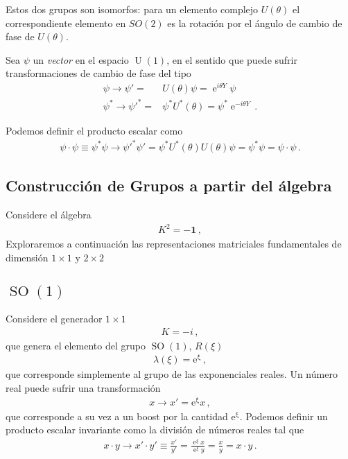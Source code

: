 Estos dos grupos son isomorfos: para un elemento complejo $U(\theta)$ el correspondiente elemento en $SO(2)$ es la rotación por el ángulo de cambio de fase de $U(\theta)$.

\begin{frame}
Sea $\psi$ un \emph{vector} en el espacio $\operatorname{U}(1)$, en el sentido que puede sufrir transformaciones de cambio de fase del tipo
\begin{align}
  \psi\to \psi'=& U(\theta)\psi= \operatorname{e}^{i \theta Y}\psi \nonumber\\
  \psi^{*}\to {\psi'}^{*}=&\psi^{*} U^{*}(\theta)=\psi^{*}\operatorname{e}^{-i \theta Y}\,.
\end{align}


Podemos definir el producto escalar como
\begin{align}
  \psi\cdot \psi\equiv\psi^{*} \psi
  \to {\psi'}^{*} \psi'=\psi^{*} U^{*}(\theta) U(\theta) \psi=\psi^{*} \psi=\psi\cdot \psi\,.
\end{align}
\end{frame}

\subsection{Construcción de Grupos a partir del álgebra}
\begin{frame}
Considere el álgebra
\begin{align}
  K^2=-\boldsymbol{1}\,,
\end{align}
Exploraremos a continuación las representaciones matriciales fundamentales de dimensión $1\times1$ y $2\times2$

\end{frame}
\subsection{$\operatorname{SO}(1)$}
\begin{frame}
Considere el generador $1\times1$
\begin{align}
  K=-i\,,
\end{align}
que genera el elemento del grupo $\operatorname{SO}(1)$, $R(\xi)$
\begin{align}
  \lambda(\xi)=\operatorname{e^{\xi}}\,,
\end{align}
que corresponde simplemente al grupo de las exponenciales reales. Un número real puede sufrir una transformación
\begin{align}
  x\to x'=\operatorname{e^{\xi}}x\,,
\end{align}
que corresponde a su vez a un boost por la cantidad $\operatorname{e^{\xi}}$. Podemos definir un producto escalar invariante como la división de números reales tal que
\begin{align}
  x\cdot y \to x'\cdot y'\equiv \frac{x'}{y'}= \frac{\operatorname{e}^{\xi}x}{\operatorname{e}^{\xi}y}=\frac{x}{y}=x\cdot y\,.
\end{align}
\end{frame}

